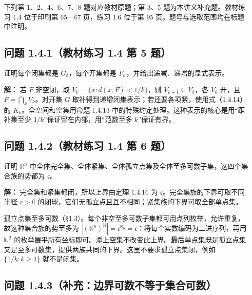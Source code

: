 \documentclass[11pt,a4paper]{article}
\begin{document}
下列第 1、2、4、6、7、8 题对应教材原题；第 3、5
题为本讲义补充题。教材练习 1.4 位于印刷第 65---67 页，练习 1.6 位于第 95
页。题号与选取范围均在标题中注明。

\subsection{问题 1.4.1（教材练习 1.4 第 5
题）}\label{ux95eeux9898-1.4.1ux6559ux6750ux7ec3ux4e60-1.4-ux7b2c-5-ux9898}

证明每个闭集都是 \(G_\delta\)，每个开集都是
\(F_\sigma\)，并给出递减、递增的显式表示。

\textbf{解：} 若 \(F\) 非空闭，取 \(V_k=\{x:d(x,F)<1/k\}\)，则
\(V_{k+1}\subseteq V_k\)，各 \(V_k\) 开，且 \(F=\bigcap_kV_k\)。对开集
\(G\) 取补得到递增闭集表示；若还要各项紧，使用式（1.4.14）的
\(K_k\)。全空间和空集用命题 1.4.13
中的特殊约定处理。这种表示的核心是用``距补集至少
\(1/k\)''保证留在内部，用``范数至多 \(k\)''保证有界。

\subsection{问题 1.4.2（教材练习 1.4 第 6
题）}\label{ux95eeux9898-1.4.2ux6559ux6750ux7ec3ux4e60-1.4-ux7b2c-6-ux9898}

证明 \(\mathbb R^n\)
中全体完全集、全体紧集、全体孤立点集及全体至多可数子集，这四个集合族的势都为
\(\mathfrak c\)。

\textbf{解：} 完全集和紧集都闭，所以上界由定理 1.4.16 为
\(\mathfrak c\)。完全集族的下界可取不同半径 \(r>0\)
的闭球，它们无孤立点且互不相同；紧集族的下界可取全部单点集。

孤立点集至多可数（§1.3）。每个非空至多可数子集都可用点列枚举，允许重复，故这种集合族的势至多为
\(|(\mathbb R^n)^{\mathbb N}|=\mathfrak c^{\aleph_0}=\mathfrak c\)：将每个实数编码为二进序列，再用
\(\mathbb N^2\)
的枚举展平所有坐标即可。添上空集不改变此上界。最后单点集既是孤立点集又是至多可数集，提供两族共同的下界。这里不要求孤立点集闭，例如
\(\{1/k:k\geq1\}\) 就不是闭集。

\subsection{问题
1.4.3（补充：边界可数不等于集合可数）}\label{ux95eeux9898-1.4.3ux8865ux5145ux8fb9ux754cux53efux6570ux4e0dux7b49ux4e8eux96c6ux5408ux53efux6570}
\end{document}
